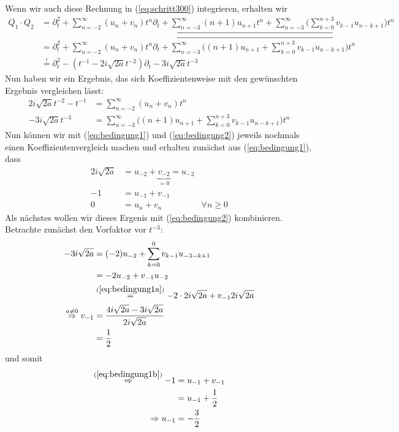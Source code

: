 Wenn wir auch diese Rechnung in (\ref{eq:schritt300}) integrieren, erhalten wir
\begin{equation} \label{eq:schritt400}
  \begin{aligned}
Q_1\cdot Q_2&=\partial_t^2 + \sum_{n=-2}^\infty (u_n+v_n)t^n \partial_t
  + \underbracket{\sum_{n=-3}^\infty (n+1)u_{n+1}t^{n}
  + \sum_{n=-3}^\infty \Big( \sum_{k=0}^{n+3} v_{k-1}u_{n-k+1} \Big) t^{n}}
\\&=\partial_t^2 + \sum_{n=-2}^\infty (u_n+v_n)t^n \partial_t
  + \overbracket{\sum_{n=-3}^\infty
  \Big( (n+1)u_{n+1} + \sum_{k=0}^{n+3} v_{k-1}u_{n-k+1} \Big) t^{n}}
\\&\overset{!}{=} \partial_t^2 - (t^{-1} - 2i\sqrt{2a}t^{-2})\partial_t
  - 3 i\sqrt{2a}t^{-3}
  \end{aligned}
\end{equation}
Nun haben wir ein Ergebnis, das sich Koeffizientenweise mit den gewünschten
Ergebnis vergleichen lässt:
\begin{align}
\label{eq:bedingung1}
2i\sqrt{2a}t^{-2} - t^{-1} &= \sum_{n=-2}^\infty (u_n+v_n)t^n
\\
\label{eq:bedingung2}
- 3 i\sqrt{2a}t^{-3} &= \sum_{n=-3}^\infty
  \Big( (n+1)u_{n+1} + \sum_{k=0}^{n+3} v_{k-1}u_{n-k+1} \Big) t^{n}
\end{align}
Nun können wir mit (\ref{eq:bedingung1}) und (\ref{eq:bedingung2}) jeweils
nochmals einen Koeffizientenvergleich machen und erhalten zunächst aus
(\ref{eq:bedingung1}), dass
\begin{align}
2i\sqrt{2a} &= u_{-2} + \underset{=0}{\underbrace{v_{-2}}} = u_{-2}
\label{eq:bedingung1a}
\\-1 &= u_{-1} + v_{-1}
\label{eq:bedingung1b}
\\0 &= u_n + v_n & \forall n \geq 0
\label{eq:bedingung1c}
\end{align}
Als nächstes wollen wir dieses Ergenis mit (\ref{eq:bedingung2}) kombinieren.
Betrachte zunächst den Vorfaktor vor $t^{-3}$:
\begin{align*}
- 3 i\sqrt{2a} &= (-2)u_{-2} + \sum_{k=0}^{0} v_{k-1}u_{-3-k+1}
\\&= -2u_{-2} + v_{-1}u_{-2}
\\&\overset{(\ref{eq:bedingung1a})}{=} -2\cdot2i\sqrt{2a} + v_{-1}2i\sqrt{2a}
\\\overset{a\neq0}{\Rightarrow} v_{-1}
  &= \frac{4i\sqrt{2a}-3i\sqrt{2a}}{2i\sqrt{2a}}
\\&= \frac{1}{2}
\end{align*}
und somit
\begin{align*}
\overset{(\ref{eq:bedingung1b})}{\Rightarrow} -1 &=u_{-1}+v_{-1}
\\ &=u_{-1}+\frac{1}{2}
\\\Rightarrow u_{-1}&=-\frac{3}{2}
\end{align*}
